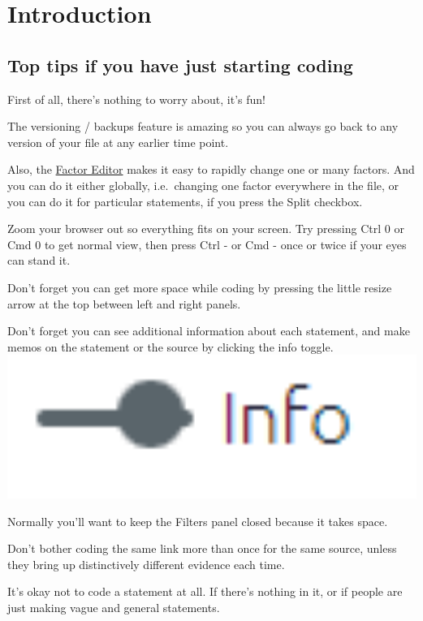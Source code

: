 \documentclass[
]{book}
\begin{document}
\hypertarget{part-introduction}{%
\part{Introduction}\label{part-introduction}}

\hypertarget{top-tips}{%
\chapter{Top tips if you have just starting coding}\label{top-tips}}

First of all, there's nothing to worry about, it's fun!

The versioning / backups feature is amazing so you can always go back to any version of your file at any earlier time point.

Also, the \protect\hyperlink{factor-editor}{Factor Editor} makes it easy to rapidly change one or many factors. And you can do it either globally, i.e.~changing one factor everywhere in the file, or you can do it for particular statements, if you press the Split checkbox.

Zoom your browser out so everything fits on your screen. Try pressing Ctrl 0 or Cmd 0 to get normal view, then press Ctrl - or Cmd - once or twice if your eyes can stand it.

Don't forget you can get more space while coding by pressing the little resize arrow at the top between left and right panels.

Don't forget you can see additional information about each statement, and make memos on the statement or the source by clicking the info toggle. \includegraphics[width=6.77083in,height=\textheight]{_assets/image-20211220153222953.png}

Normally you'll want to keep the Filters panel closed because it takes space.

Don't bother coding the same link more than once for the same source, unless they bring up distinctively different evidence each time.

It's okay not to code a statement at all. If there's nothing in it, or if people are just making vague and general statements.
\end{document}
